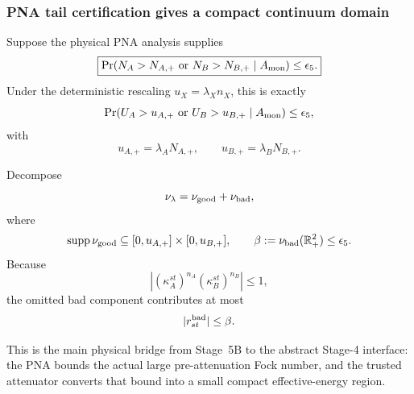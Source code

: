 \documentclass[11pt]{article}
\theoremstyle{remark}
\begin{document}
\subsubsection{PNA tail certification gives a compact continuum domain}

Suppose the physical PNA analysis supplies
\begin{equation}
    \boxed{
    \Pr(
      N_A>N_{A,+}
      \ \text{or}\
      N_B>N_{B,+}
      \mid A_{\rm mon}
    )
    \le
    \epsilon_5.
    }
    \label{eq:stage5b-preloss-tail}
\end{equation}
Under the deterministic rescaling \(u_X=\lambda_Xn_X\), this is exactly
\begin{equation}
    \Pr(
      U_A>u_{A,+}
      \ \text{or}\
      U_B>u_{B,+}
      \mid A_{\rm mon}
    )
    \le
    \epsilon_5,
    \label{eq:stage5b-u-tail}
\end{equation}
with
\begin{equation}
    \boxed{
    u_{A,+}
    =
    \lambda_A N_{A,+},
    \qquad
    u_{B,+}
    =
    \lambda_B N_{B,+}.
    }
    \label{eq:stage5b-u-caps}
\end{equation}

Decompose
\begin{equation}
    \nu_\lambda
    =
    \nu_{\rm good}
    +
    \nu_{\rm bad},
\end{equation}
where
\begin{equation}
    \operatorname{supp}\nu_{\rm good}
    \subseteq
    [0,u_{A,+}]
    \times
    [0,u_{B,+}],
    \qquad
    \beta
    :=
    \nu_{\rm bad}(\mathbb R_+^2)
    \le
    \epsilon_5.
    \label{eq:stage5b-good-bad}
\end{equation}
Because
\[
    \left|
      \left(\kappa_A^{st}\right)^{n_A}
      \left(\kappa_B^{st}\right)^{n_B}
    \right|
    \le1,
\]
the omitted bad component contributes at most
\begin{equation}
    |r_{st}^{\rm bad}|
    \le
    \beta.
    \label{eq:stage5b-bad-overlap}
\end{equation}

This is the main physical bridge from Stage~5B to the abstract Stage-4
interface: the PNA bounds the actual large pre-attenuation Fock number, and the
trusted attenuator converts that bound into a small compact effective-energy
region.
\end{document}
